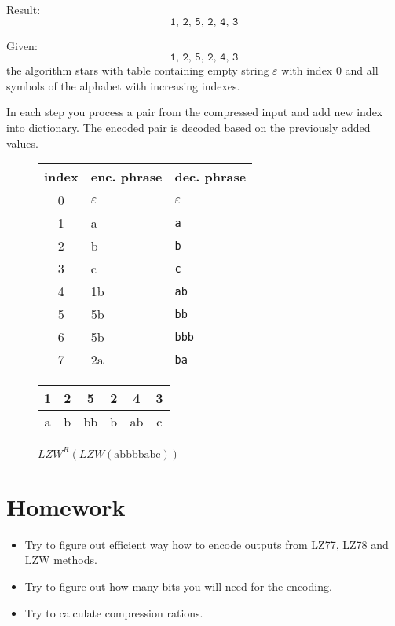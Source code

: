 Result: $$ \texttt{1, 2, 5, 2, 4, 3}$$

Given: $$ \texttt{1, 2, 5, 2, 4, 3}$$
the algorithm stars with table containing empty string $\varepsilon$ with index $0$ and all symbols of the alphabet with increasing indexes.

In each step you process a pair from the compressed input and add new index into dictionary. The encoded pair is decoded based on the previously added values.

\begin{figure}
  \begin{center}
  \begin{tabular}{c|l|l}
    index & enc. phrase & dec. phrase \\
    \hline
    0 & $\varepsilon$ & $\varepsilon$\\
    1 & a & \texttt{a}\\
    2 & b & \texttt{b}\\
    3 & c & \texttt{c}\\
    4 & 1b & \texttt{ab}\\
    5 & 5b & \texttt{bb}\\
    6 & 5b & \texttt{bbb}\\
    7 & 2a & \texttt{ba}\\
  \end{tabular}
  \begin{tabular}{|c|c|c|c|c|c|}
    \hline
    1 & 2 & 5 & 2 & 4 & 3\\
    \hline
    a & b & bb & b & ab & c\\
    \hline
  \end{tabular}
  \end{center}
  \caption{$LZW^R(LZW(\text{abbbbabc}))$}
\end{figure}

\section{Homework}

\begin{itemize}
  \item Try to figure out efficient way how to encode outputs from LZ77, LZ78 and LZW methods. 
  \item Try to figure out how many bits you will need for the encoding.
  \item Try to calculate compression rations. 
\end{itemize}
